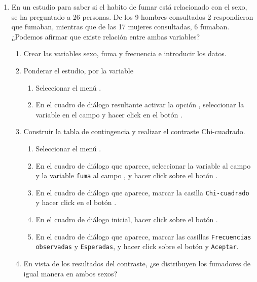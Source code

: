 \begin{enumerate}[leftmargin=*]
\item En un estudio para saber si el habito de fumar está relacionado con el sexo, se ha preguntado a 26 personas. De los 9 hombres consultados 2 respondieron que fumaban, mientras que de las 17 mujeres consultadas, 6 fumaban. ¿Podemos afirmar que existe relación entre ambas variables?
\begin{enumerate}
\item Crear las variables \textsf{sexo},
\textsf{fuma} y \textsf{frecuencia} e introducir los datos.
\item Ponderar el estudio, por la variable 
\begin{indicacion}
\begin{enumerate}
\item Seleccionar el menú .
\item En el cuadro de diálogo resultante activar la opción , seleccionar la variable  en el campo  y hacer click en el botón .
\end{enumerate}
\end{indicacion}

\item Construir la tabla de contingencia y realizar el contraste Chi-cuadrado.
\begin{indicacion}
\begin{enumerate}
\item Seleccionar el menú .
\item En el cuadro de diálogo que aparece, seleccionar la variable  al campo  y la variable \texttt{fuma} al campo , y hacer click sobre el botón .
\item En el cuadro de diálogo que aparece, marcar la casilla \texttt{Chi-cuadrado} y hacer click en el botón .
\item En el cuadro de diálogo inicial, hacer click sobre el botón .
\item En el cuadro de diálogo que aparece, marcar las casillas \texttt{Frecuencias observadas} y \texttt{Esperadas}, y hacer click sobre el botón  y \texttt{Aceptar}.
\end{enumerate}
\end{indicacion}

\item En vista de los resultados del contraste, ¿se distribuyen los fumadores de igual manera en ambos sexos?


\end{enumerate}
\end{enumerate}
